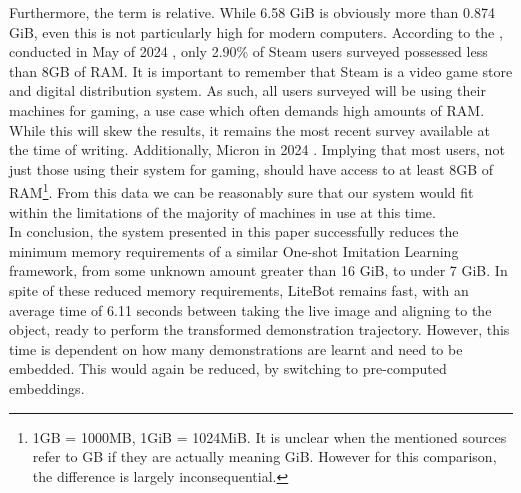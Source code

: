 Furthermore, the term  is relative. While 6.58 GiB is obviously more than 0.874 GiB, even this is not particularly high for modern computers. According to the , conducted in May of 2024 \cite{steam-RAM}, only 2.90\% of Steam users surveyed possessed less than 8GB of RAM. It is important to remember that Steam is a video game store and digital distribution system. As such, all users surveyed will be using their machines for gaming, a use case which often demands high amounts of RAM. While this will skew the results, it remains the most recent survey available at the time of writing. Additionally, Micron  in 2024 \cite{RAM-req}. Implying that most users, not just those using their system for gaming, should have access to at least 8GB of RAM\footnote{1GB = 1000MB,  1GiB = 1024MiB. It is unclear when the mentioned sources refer to GB if they are actually meaning GiB. However for this comparison, the difference is largely inconsequential.}. From this data we can be reasonably sure that our system would fit within the limitations of the majority of machines in use at this time.\\

In conclusion, the system presented in this paper successfully reduces the minimum memory requirements of a similar One-shot Imitation Learning framework, from some unknown amount greater than 16 GiB, to under 7 GiB. In spite of these reduced memory requirements, LiteBot remains fast, with an average time of 6.11 seconds between taking the live image and aligning to the object, ready to perform the transformed demonstration trajectory. However, this time is dependent on how many demonstrations are learnt and need to be embedded. This would again be reduced, by switching to pre-computed embeddings.




